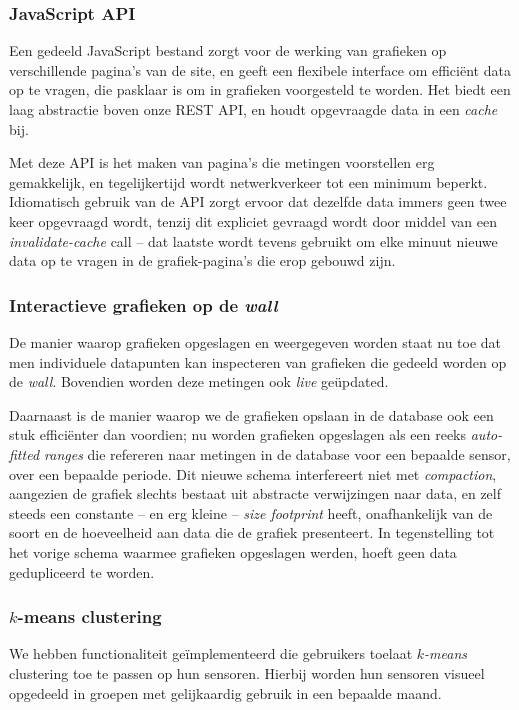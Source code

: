 \documentclass[12pt,parskip=full]{article}
\begin{document}
\subsubsection{JavaScript API}

Een gedeeld JavaScript bestand zorgt voor de werking van grafieken op verschillende pagina's van de site, en geeft een flexibele interface om effici\"ent data op te vragen, die pasklaar is om in grafieken voorgesteld te worden. Het biedt een laag abstractie boven onze REST API, en houdt opgevraagde data in een \emph{cache} bij.

Met deze API is het maken van pagina's die metingen voorstellen erg gemakkelijk, en tegelijkertijd wordt netwerkverkeer tot een minimum beperkt. Idiomatisch gebruik van de API zorgt ervoor dat dezelfde data immers geen twee keer opgevraagd wordt, tenzij dit expliciet gevraagd wordt door middel van een \emph{invalidate-cache} call -- dat laatste wordt tevens gebruikt om elke minuut nieuwe data op te vragen in de grafiek-pagina's die erop gebouwd zijn.

\subsubsection{Interactieve grafieken op de \emph{wall}}

De manier waarop grafieken opgeslagen en weergegeven worden staat nu toe dat men individuele datapunten kan inspecteren van grafieken die gedeeld worden op de \emph{wall}. Bovendien worden deze metingen ook \emph{live} ge\"updated.

Daarnaast is de manier waarop we de grafieken opslaan in de database ook een stuk effici\"enter dan voordien; nu worden grafieken opgeslagen als een reeks \emph{auto-fitted ranges} die refereren naar metingen in de database voor een bepaalde sensor, over een bepaalde periode. Dit nieuwe schema interfereert niet met \emph{compaction}, aangezien de grafiek slechts bestaat uit abstracte verwijzingen naar data, en zelf steeds een constante -- en erg kleine -- \emph{size footprint} heeft, onafhankelijk van de soort en de hoeveelheid aan data die de grafiek presenteert. In tegenstelling tot het vorige schema waarmee grafieken opgeslagen werden, hoeft geen data gedupliceerd te worden. 

\subsubsection{$k$-means clustering}
We hebben functionaliteit ge\"implementeerd die gebruikers toelaat 
\textit{$k$-means} clustering toe te passen op hun sensoren. Hierbij worden hun 
sensoren visueel opgedeeld in groepen met gelijkaardig gebruik in een bepaalde 
maand.
\end{document}
